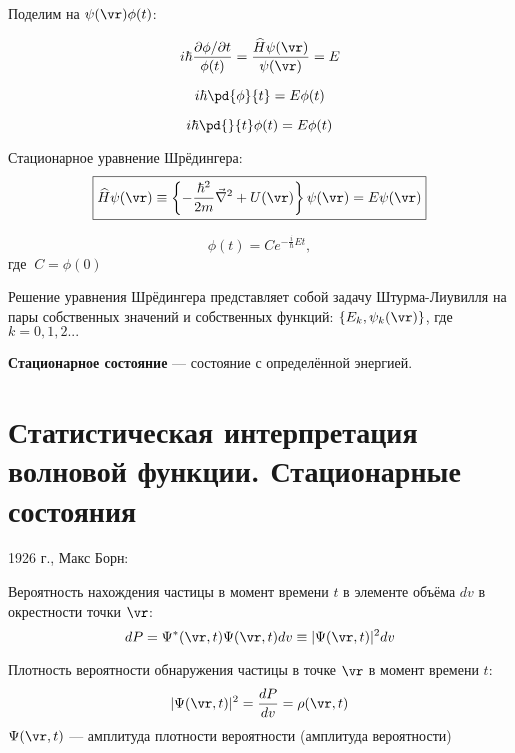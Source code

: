Поделим на $\psi(\vr)\phi(t)$:

$$i \hbar \frac{\partial \phi / \partial t}{\phi(t)} = \frac{\widehat{H} \psi(\vr)}{\psi(\vr)} = E$$

\begin{equation}
\label{eq:1_3_4}
i \hbar \pd{\phi}{t} = E \phi(t)
\end{equation}

\begin{equation}
\label{eq:1_3_5}
i \hbar \pd{}{t} \phi(t) = E \phi(t)
\end{equation}

Стационарное уравнение Шрёдингера:
\begin{equation}
\label{eq:1_3_6}
\boxed{\widehat{H} \psi(\vr) \equiv \left\{ -\frac{\hbar^2}{2m} \vec{\nabla}^2 + U(\vr) \right\}\psi(\vr) = E\psi(\vr)}
\end{equation}

$$\phi(t)=C e^{-\frac{i}{\hbar}Et},$$
где $~C=\phi(0)$

Решение уравнения Шрёдингера представляет собой задачу Штурма-Лиувилля на пары собственных значений и собственных функций: $\{E_k, \psi_k(\vr)\}$, где $k=0,1,2...$

\textbf{Стационарное состояние} --- состояние с определённой энергией.

\begin{sloppypar}
  \section{Статистическая интерпретация волновой функции. Стационарные состояния}
\end{sloppypar}

1926 г., Макс Борн: 

\begin{defn}
Вероятность нахождения частицы в момент времени $t$ в элементе объёма $dv$ в окрестности точки $\vr$:
\begin{equation}
\label{eq:1_4_1}
dP = \Psi^*(\vr,t) \Psi(\vr,t) dv \equiv|\Psi(\vr,t)|^2dv
\end{equation}
\end{defn}

\begin{defn}
Плотность вероятности обнаружения частицы в точке $\vr$ в момент времени $t$:
\begin{equation}
\label{eq:1_4_2}
|\Psi(\vr,t)|^2 = \frac{dP}{dv} = \rho(\vr,t)
\end{equation}
$\Psi(\vr,t)$ --- амплитуда плотности вероятности (амплитуда вероятности)
\end{defn}



